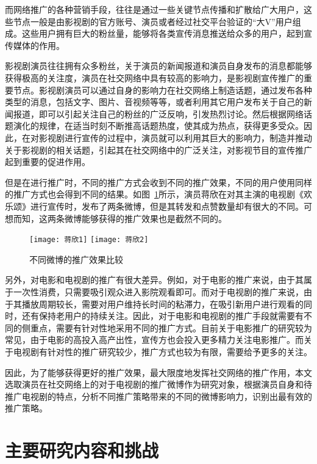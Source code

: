而网络推广的各种营销手段，往往是通过一些关键节点传播和扩散给广大用户，这些节点一般是由影视剧的官方账号、演员或者经过社交平台验证的“大V”用户组成。这些用户拥有巨大的粉丝量，能够将各类宣传消息推送给众多的用户，起到宣传媒体的作用\cite{kwak2010twitter}。

影视剧演员往往拥有众多粉丝，关于演员的新闻报道和演员自身发布的消息都能够获得极高的关注度，演员在社交网络中具有较高的影响力\cite{shafiq2013identifying}，是影视剧宣传推广的重要节点。影视剧演员可以通过自身的影响力在社交网络上制造话题，通过发布各种类型的消息，包括文字、图片、音视频等等，或者利用其它用户发布关于自己的新闻报道，即可以引起关注自己的粉丝的广泛反响，引发热烈讨论。然后根据网络话题演化的规律\cite{he2009detecting}，在适当时刻不断推高话题热度，使其成为热点，获得更多受众。因此，在对影视剧进行宣传的过程中，演员就可以利用其巨大的影响力，制造并推动关于影视剧的相关话题，引起其在社交网络中的广泛关注，对影视节目的宣传推广起到重要的促进作用。

但是在进行推广时，不同的推广方式会收到不同的推广效果，不同的用户使用同样的推广方式也会得到不同的结果。如图~\ref{蒋欣}所示，演员蒋欣在对其主演的电视剧《欢乐颂》进行宣传时，发布了两条微博，但是其转发和点赞数量却有很大的不同。可想而知，这两条微博能够获得的推广效果也是截然不同的。

\begin{figure}[h]
  \centering%
    {\texttt{[image: 蒋欣1]}}
      {\texttt{[image: 蒋欣2]}}
  \caption{不同微博的推广效果比较}
  \label{蒋欣}
\end{figure}

另外，对电影和电视剧的推广有很大差异。例如，对于电影的推广来说，由于其属于一次性消费，只需要吸引观众进入影院观看即可。而对于电视剧的推广来说，由于其播放周期较长，需要对用户维持长时间的粘滞力，在吸引新用户进行观看的同时，还有保持老用户的持续关注。因此，对于电影和电视剧的推广手段就需要有不同的侧重点，需要有针对性地采用不同的推广方式。目前关于电影推广的研究较为常见，由于电影的高投入高产出性，宣传方也会投入更多精力关注电影推广。而关于电视剧有针对性的推广研究较少，推广方式也较为有限，需要给予更多的关注。

因此，为了能够获得更好的推广效果，最大限度地发挥社交网络的推广作用，本文选取演员在社交网络上的对于电视剧的推广微博作为研究对象，根据演员自身和待推广电视剧的特点，分析不同推广策略带来的不同的微博影响力，识别出最有效的推广策略。

\section{主要研究内容和挑战}


